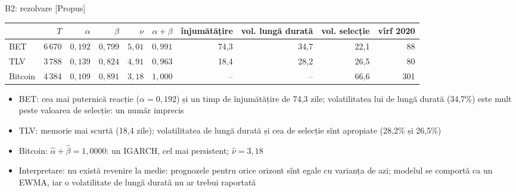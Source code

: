 \ifsolutions
\begin{frame}{B2: rezolvare [Propus]}
\itemsize{\footnotesize}
\begin{center}
\scriptsize
\begin{tabular}{lrrrrrrrrr}
\toprule
& $T$ & $\alpha$ & $\beta$ & $\nu$ & $\alpha + \beta$ & înjumătățire & vol. lungă durată & vol. selecție & vîrf 2020 \\
\midrule
BET & 6\,670 & $0{,}192$ & $0{,}799$ & $5{,}01$ & $0{,}991$ & 74{,}3 & 34{,}7 & 22{,}1 & 88 \\
TLV & 3\,788 & $0{,}139$ & $0{,}824$ & $4{,}91$ & $0{,}963$ & 18{,}4 & 28{,}2 & 26{,}5 & 80 \\
Bitcoin & 4\,384 & $0{,}109$ & $0{,}891$ & $3{,}18$ & $1{,}000$ & -- & -- & 66{,}6 & 301 \\
\bottomrule
\end{tabular}
\end{center}
\begin{itemize}
    \item BET: cea mai puternică reacție ($\alpha = 0{,}192$) și un timp de înjumătățire de 74{,}3 zile; volatilitatea lui de lungă durată (34{,}7\%) este mult peste valoarea de selecție: un număr imprecis
    \item TLV: memorie mai scurtă (18{,}4 zile); volatilitatea de lungă durată și cea de selecție sînt apropiate (28{,}2\% și 26{,}5\%)
    \item Bitcoin: $\hat\alpha + \hat\beta = 1{,}0000$: un IGARCH, cel mai persistent; $\hat\nu = 3{,}18$
    \item Interpretare: nu există revenire la medie: prognozele pentru orice orizont sînt egale cu varianța de azi; modelul se comportă ca un EWMA, iar o volatilitate de lungă durată nu ar trebui raportată
\end{itemize}
\end{frame}
\fi

